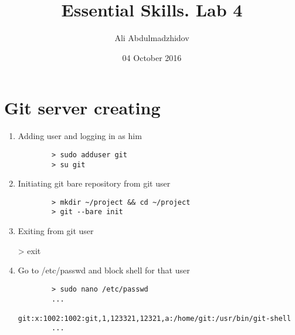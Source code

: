 \documentclass[10pt]{article}
\title{Essential Skills. Lab 4}
\date{04 October 2016}
\author{Ali Abdulmadzhidov}
\begin{document}
\renewcommand*\rmdefault{cmss}
\maketitle

\section{Git server creating}
\begin{enumerate}
	\item Adding user and logging in as him
	\begin{verbatim}
		> sudo adduser git
		> su git
	\end{verbatim}
	\item Initiating git bare repository from git user
	\begin{verbatim}
		> mkdir ~/project && cd ~/project
		> git --bare init
	\end{verbatim}
	\item Exiting from git user
	\begin{enumerate}
		> exit
	\end{enumerate}
	\item Go to /etc/passwd and block shell for that user
	\begin{verbatim}
		> sudo nano /etc/passwd
		...
		git:x:1002:1002:git,1,123321,12321,a:/home/git:/usr/bin/git-shell
		...
	\end{verbatim}
\end{enumerate}
\end{document}
